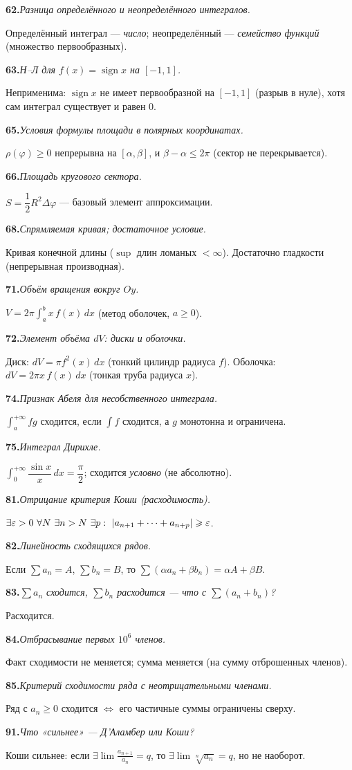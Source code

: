 \documentclass[10pt,a4paper]{article}
\DeclareMathOperator{\sign}{sign}
\newcommand{\dx}{\,dx}
\newcommand{\eps}{\varepsilon}
\renewcommand{\le}{\leqslant}
\renewcommand{\ge}{\geqslant}
\DeclarePairedDelimiter{\abs}{\lvert}{\rvert}
\theoremstyle{definition}
\theoremstyle{plain}
\newcommand{\writespace}{\vspace{7.5mm}}
\newcommand{\faq}[3]{%
  \par\smallskip\noindent
  \textbf{#1.}\enspace\textit{#2}\par
  \nobreak\vspace{0.3ex}\noindent #3\par
  \writespace}
\begin{document}
\faq{62}{Разница определённого и неопределённого интегралов.}{%
Определённый интеграл — \emph{число}; неопределённый — \emph{семейство функций} (множество
первообразных).}

\faq{63}{Н–Л для $f(x)=\sign x$ на $[-1,1]$.}{%
Неприменима: $\sign x$ не имеет первообразной на $[-1,1]$ (разрыв в нуле), хотя сам интеграл
существует и равен $0$.}

\faq{65}{Условия формулы площади в полярных координатах.}{%
$\rho(\varphi)\ge0$ непрерывна на $[\alpha,\beta]$, и $\beta-\alpha\le2\pi$ (сектор не
перекрывается).}

\faq{66}{Площадь кругового сектора.}{%
$S=\dfrac12 R^2\Delta\varphi$ — базовый элемент аппроксимации.}

\faq{68}{Спрямляемая кривая; достаточное условие.}{%
Кривая конечной длины ($\sup$ длин ломаных $<\infty$). Достаточно гладкости (непрерывная
производная).}

\faq{71}{Объём вращения вокруг $Oy$.}{%
$V=2\pi\int_a^b x\,f(x)\dx$ (метод оболочек, $a\ge0$).}

\faq{72}{Элемент объёма $dV$: диски и оболочки.}{%
Диск: $dV=\pi f^2(x)\dx$ (тонкий цилиндр радиуса $f$). Оболочка: $dV=2\pi x\,f(x)\dx$ (тонкая труба
радиуса $x$).}

\faq{74}{Признак Абеля для несобственного интеграла.}{%
$\int_a^{+\infty}fg$ сходится, если $\int f$ сходится, а $g$ монотонна и ограничена.}

\faq{75}{Интеграл Дирихле.}{%
$\int_0^{+\infty}\dfrac{\sin x}{x}\dx=\dfrac\pi2$; сходится \emph{условно} (не абсолютно).}

\faq{81}{Отрицание критерия Коши (расходимость).}{%
$\exists\eps>0\ \forall N\ \exists n>N\ \exists p:\ \abs{a_{n+1}+\dots+a_{n+p}}\ge\eps$.}

\faq{82}{Линейность сходящихся рядов.}{%
Если $\sum a_n=A$, $\sum b_n=B$, то $\sum(\alpha a_n+\beta b_n)=\alpha A+\beta B$.}

\faq{83}{$\sum a_n$ сходится, $\sum b_n$ расходится — что с $\sum(a_n+b_n)$?}{%
Расходится.}

\faq{84}{Отбрасывание первых $10^6$ членов.}{%
Факт сходимости не меняется; сумма меняется (на сумму отброшенных членов).}

\faq{85}{Критерий сходимости ряда с неотрицательными членами.}{%
Ряд с $a_n\ge0$ сходится $\iff$ его частичные суммы ограничены сверху.}

\faq{91}{Что «сильнее» — Д'Аламбер или Коши?}{%
Коши сильнее: если $\exists\lim\frac{a_{n+1}}{a_n}=q$, то $\exists\lim\sqrt[n]{a_n}=q$, но не
наоборот.}
\end{document}
